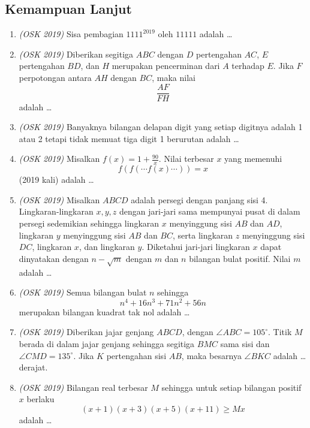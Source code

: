 \documentclass[11pt]{scrartcl}
\begin{document}
\subsection{Kemampuan Lanjut}
\begin{enumerate}
\item \textit{(OSK 2019)} Sisa pembagian $1111^{2019}$ oleh $11111$ adalah \dots

\item \textit{(OSK 2019)} Diberikan segitiga $ABC$ dengan $D$ pertengahan $AC$, $E$ pertengahan $BD$, dan $H$ merupakan pencerminan dari $A$ terhadap $E$.  
Jika $F$ perpotongan antara $AH$ dengan $BC$, maka nilai
\[
\frac{AF}{FH}
\]
adalah \dots

\item \textit{(OSK 2019)} Banyaknya bilangan delapan digit yang setiap digitnya adalah 1 atau 2 tetapi tidak memuat tiga digit 1 berurutan adalah \dots

\item \textit{(OSK 2019)} Misalkan $f(x) = 1 + \frac{90}{x}$.  
Nilai terbesar $x$ yang memenuhi
\[
f(f(\cdots f(x)\cdots)) = x
\]
(2019 kali) adalah \dots

\item \textit{(OSK 2019)} Misalkan $ABCD$ adalah persegi dengan panjang sisi 4.  
Lingkaran-lingkaran $x, y, z$ dengan jari-jari sama mempunyai pusat di dalam persegi sedemikian sehingga lingkaran $x$ menyinggung sisi $AB$ dan $AD$, lingkaran $y$ menyinggung sisi $AB$ dan $BC$, serta lingkaran $z$ menyinggung sisi $DC$, lingkaran $x$, dan lingkaran $y$.  
Diketahui jari-jari lingkaran $x$ dapat dinyatakan dengan $n - \sqrt{m}$ dengan $m$ dan $n$ bilangan bulat positif.  
Nilai $m$ adalah \dots

\item \textit{(OSK 2019)} Semua bilangan bulat $n$ sehingga
\[
n^4 + 16n^3 + 71n^2 + 56n
\]
merupakan bilangan kuadrat tak nol adalah \dots

\item \textit{(OSK 2019)} Diberikan jajar genjang $ABCD$, dengan $\angle ABC = 105^\circ$.  
Titik $M$ berada di dalam jajar genjang sehingga segitiga $BMC$ sama sisi dan $\angle CMD = 135^\circ$.  
Jika $K$ pertengahan sisi $AB$, maka besarnya $\angle BKC$ adalah \dots derajat.

\item \textit{(OSK 2019)} Bilangan real terbesar $M$ sehingga untuk setiap bilangan positif $x$ berlaku
\[
(x+1)(x+3)(x+5)(x+11) \ge Mx
\]
adalah \dots


\end{enumerate}
\end{document}
